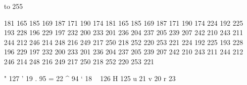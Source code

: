 

\startmapping[il2]

 to 255    %

 181 165    185 169 
 187 171    190 174 
 181 165    185 169 
 187 171    190 174 
 224 192    225 193 
 228 196    229 197 
 232 200    233 201 
 236 204    237 205 
 239 207    242 210 
 243 211    244 212 
 246 214    248 216 
 249 217    250 218 
 252 220    253 221 
 224 192    225 193 
 228 196    229 197 
 232 200    233 201 
 236 204    237 205 
 239 207    242 210 
 243 211    244 212 
 246 214    248 216 
 249 217    250 218 
 252 220    253 221 

\stopmapping

\startcoding[il2]


 " 127
 '  19
 .  95
 =  22
 ^  94
 `  18
 ~ 126
 H 125
 u  21
 v  20
 r  23 

